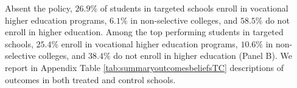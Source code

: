 Absent the policy, $26.9\%$ of students in targeted schools enroll in vocational higher education programs, $6.1\%$ in non-selective colleges, and $58.5\%$ do not enroll in higher education. Among the top performing students in targeted schools, $25.4\%$ enroll in vocational higher education programs, $10.6\%$ in non-selective colleges, and $38.4\%$ do not enroll in higher education (Panel B). We report in Appendix Table \ref{tab:summaryoutcomesbeliefsTC} descriptions of outcomes in both treated and control schools.\par 
